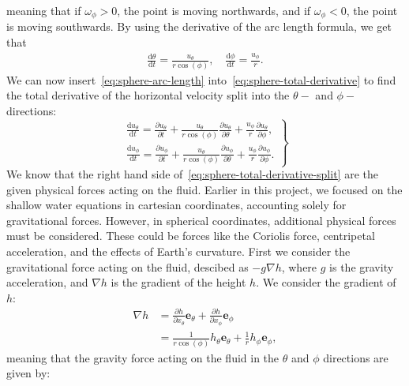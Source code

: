 meaning that if $\omega_\phi > 0$, the point is moving northwards, and if $\omega_\phi < 0$, the point is moving southwards.
By using the  derivative of the arc length formula, we get that 
\begin{align}\label{eq:sphere-arc-length}
    \frac{\text{d}\theta}{\text{d}t} =  \frac{u_\theta}{r \cos(\phi)},
    \quad \frac{\text{d}\phi}{\text{d}t} = \frac{u_\phi}{r}.
\end{align}
We can now insert~\eqref{eq:sphere-arc-length} into~\eqref{eq:sphere-total-derivative} to find the total derivative of the horizontal velocity split into the $\theta-$ and $\phi-$directions:
\begin{equation}\label{eq:sphere-total-derivative-split}
    \left.
    \begin{aligned}
        \frac{\text{d}u_\theta}{\text{d}t} = \frac{\partial u_\theta}{\partial t} + \frac{u_\theta}{r \cos(\phi)} \frac{\partial u_\theta}{\partial \theta} + \frac{u_\phi}{r} \frac{\partial u_\theta}{\partial \phi}, \\
        \frac{\text{d}u_\phi}{\text{d}t} = \frac{\partial u_\phi}{\partial t} + \frac{u_\theta}{r \cos(\phi)} \frac{\partial u_\phi}{\partial \theta} + \frac{u_\phi}{r} \frac{\partial u_\phi}{\partial \phi}.
    \end{aligned}
    \right\}
\end{equation}
We know that the right hand side of~\eqref{eq:sphere-total-derivative-split} are the given physical forces acting on the fluid.
Earlier in this project, we focused on the shallow water equations in cartesian coordinates, accounting solely for gravitational forces.
However, in spherical coordinates, additional physical forces must be considered.
These could be forces like the Coriolis force, centripetal acceleration, and the effects of Earth's curvature.
First we consider the gravitational force acting on the fluid, descibed as $-g \nabla h$, where $g$ is the gravity acceleration, and $\nabla h$ is the gradient of the height $h$.
We consider the gradient of $h$:
\begin{equation*}
    \begin{aligned}
        \nabla h &= \frac{\partial h}{\partial x_\theta} \mathbf{e}_{\theta} + \frac{\partial h}{\partial x_\phi} \mathbf{e}_{\phi} \\
        &= \frac{1}{r \cos(\phi)} h_{\theta} \mathbf{e}_{\theta} + \frac{1}{r } h_{\phi} \mathbf{e}_{\phi},
    \end{aligned}
\end{equation*}
meaning that the gravity force acting on the fluid in the $\theta$ and $\phi$ directions are given by:
